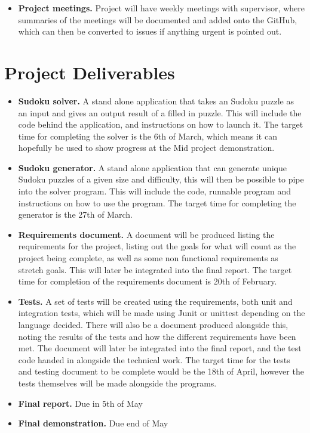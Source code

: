\documentclass[a4paper,10pt]{article}
\begin{document}
\begin{itemize}
\begin{itemize}
	\end{itemize} 
	\item \textbf{Project meetings.} Project will have weekly meetings with supervisor, where summaries of the meetings will be documented and added onto the GitHub, which can then be converted to issues if anything urgent is pointed out.
\end{itemize}
\section*{Project Deliverables}
\begin{itemize}
	\item \textbf{Sudoku solver.} A stand alone application that takes an Sudoku puzzle as an input and gives an output result of a filled in puzzle. This will include the code behind the application, and instructions on how to launch it. The target time for completing the solver is the 6th of March, which means it can hopefully be used to show progress at the Mid project demonstration.
	\item \textbf{Sudoku generator.} A stand alone application that can generate unique Sudoku puzzles of a given size and difficulty, this will then be possible to pipe into the solver program. This will include the code, runnable program and instructions on how to use the program. The target time for completing the generator is the 27th of March.
	\item \textbf{Requirements document.} A document will be produced listing the requirements for the project, listing out the goals for what will count as the project being complete, as well as some non functional requirements as stretch goals. This will later be integrated into the final report. The target time for completion of the requirements document is 20th of February.
	\item \textbf{Tests.} A set of tests will be created using the requirements, both unit and integration tests, which will be made using Junit or unittest depending on the language decided. There will also be a document produced alongside this, noting the results of the tests and how the different requirements have been met. The document will later be integrated into the final report, and the test code handed in alongside the technical work. The target time for the tests and testing document to be complete would be the 18th of April, however the tests themselves will be made alongside the programs.
	\item \textbf{Final report.} Due in 5th of May
	\item \textbf{Final demonstration.} Due end of May
\end{itemize}
\end{document}
